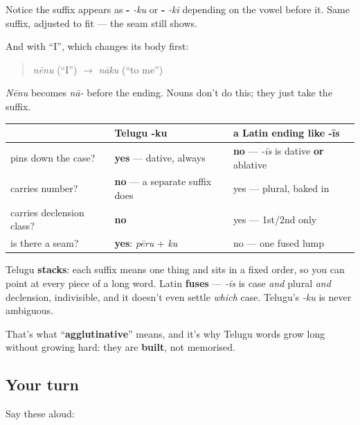 Notice the suffix appears as \textbf{-} \emph{-ku} or \textbf{-} \emph{-ki} depending on the vowel before it. Same suffix, adjusted to fit — the seam still shows.

And with \textquotedblleft{}I\textquotedblright{}, which changes its body first:

\begin{quote}
\textbf{} \emph{nēnu} (\textquotedblleft{}I\textquotedblright{}) $\to$ \textbf{} \emph{nāku} (\textquotedblleft{}to me\textquotedblright{})
\end{quote}

\emph{Nēnu} becomes \emph{nā-} before the ending. Nouns don't do this; they just take the suffix.

\begin{grammarlens}[title={Grammar Lens: Why this matters}]
\noindent
\begin{tabularx}{\linewidth}{@{}>{\raggedright\arraybackslash}X>{\raggedright\arraybackslash}X>{\raggedright\arraybackslash}X@{}}
\toprule
\textbf{} & \textbf{Telugu \textbf{-ku}} & \textbf{a Latin ending like \textbf{-īs}} \\
\midrule
pins down the case? & \textbf{yes} — dative, always & \textbf{no} — \emph{-īs} is dative \textbf{or} ablative \\
carries number? & \textbf{no} — a separate suffix does & yes — plural, baked in \\
carries declension class? & \textbf{no} & yes — 1st/2nd only \\
is there a seam? & \textbf{yes}: \emph{pēru} + \emph{ku} & no — one fused lump \\
\bottomrule
\end{tabularx}

Telugu \textbf{stacks}: each suffix means one thing and sits in a fixed order, so you can point at every piece of a long word. Latin \textbf{fuses} — \emph{-īs} is case \emph{and} plural \emph{and} declension, indivisible, and it doesn't even settle \emph{which} case. Telugu's \emph{-ku} is never ambiguous.

That's what \textquotedblleft{}\textbf{agglutinative}\textquotedblright{} means, and it's why Telugu words grow long without growing hard: they are \textbf{built}, not memorised.
\end{grammarlens}

\subsection*{Your turn}
Say these aloud:

